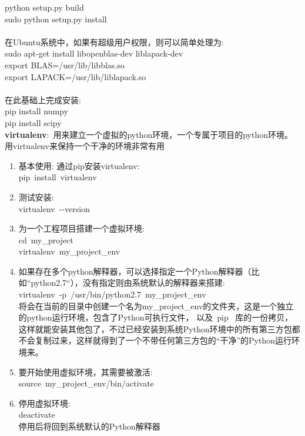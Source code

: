 \documentclass[10pt,a4paper]{article}
\begin{document}
python setup.py build\\
sudo python setup.py install\\
\\
在\textrm{Ubuntu}系统中，如果有超级用户权限，则可以简单处理为:\\
sudo apt-get install libopenblas-dev liblapack-dev\\
export BLAS=/usr/lib/libblas.so\\
export LAPACK=/usr/lib/liblapack.so\\
\\
在此基础上完成安装:\\
pip install numpy\\
pip install scipy\\

\textbf{virtualenv}:~用来建立一个虚拟的\textrm{python}环境，一个专属于项目的\textrm{python}环境。
用\textrm{virtualenv}来保持一个干净的环境非常有用
\begin{enumerate}
	\item 基本使用: 通过\textrm{pip}安装\textrm{virtualenv}:\\
		\textrm{pip~install~virtualenv}
	\item 测试安装:\\
		\textrm{virtualenv~-\/-version}
	\item 为一个工程项目搭建一个虚拟环境:\\
		\textrm{cd~my\_project}\\
		\textrm{virtualenv~my\_project_env}
	\item 如果存在多个\textrm{python}解释器，可以选择指定一个\textrm{Python}解释器（比如``\textrm{python2.7}``），没有指定则由系统默认的解释器来搭建:\\
		\textrm{virtualenv~-p~/usr/bin/python2.7~my\_project\_env}\\
		将会在当前的目录中创建一个名为\textrm{my\_project\_env}的文件夹，这是一个独立的\textrm{python}运行环境，包含了\textrm{Python}可执行文件， 以及~\textrm{pip}~ 库的一份拷贝，这样就能安装其他包了，不过已经安装到系统\textrm{Python}环境中的所有第三方包都不会复制过来，这样就得到了一个不带任何第三方包的“干净”的\textrm{Python}运行环境来。
	\item 要开始使用虚拟环境，其需要被激活:\\
		\textrm{source~my\_project\_env/bin/activate}
	\item 停用虚拟环境:\\
		\textrm{deactivate}\\
		停用后将回到系统默认的\textrm{Python}解释器
\end{enumerate}
\end{document}
